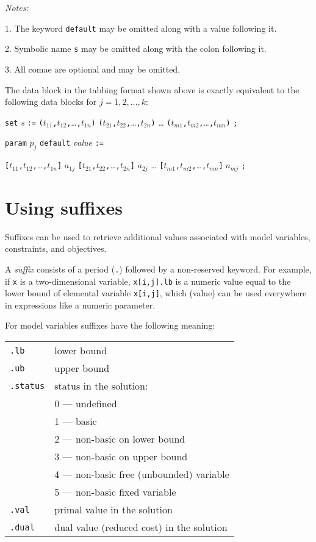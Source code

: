 \documentclass[10pt]{article}
\begin{document}
{\it Notes:}

1. The keyword {\tt default} may be omitted along with a value
following it.

2. Symbolic name {\tt s} may be omitted along with the colon following
it.

3. All comae are optional and may be omitted.

\medskip

The data block in the tabbing format shown above is exactly equivalent
to the following data blocks for $j=1,2,\dots,k$:

\medskip

{\tt set} {\it s} {\tt:=}
{\tt(}$t_{11}${\tt,}$t_{12}${\tt,}\dots{\tt,}$t_{1n}${\tt)}
{\tt(}$t_{21}${\tt,}$t_{22}${\tt,}\dots{\tt,}$t_{2n}${\tt)} \dots
{\tt(}$t_{m1}${\tt,}$t_{m2}${\tt,}\dots{\tt,}$t_{mn}${\tt)} {\tt;}

{\tt param} $p_j$ {\tt default} {\it value} {\tt:=}

$\!${\tt[}$t_{11}${\tt,}$t_{12}${\tt,}\dots{\tt,}$t_{1n}${\tt]}
$a_{1j}$
{\tt[}$t_{21}${\tt,}$t_{22}${\tt,}\dots{\tt,}$t_{2n}${\tt]} $a_{2j}$
\dots
{\tt[}$t_{m1}${\tt,}$t_{m2}${\tt,}\dots{\tt,}$t_{mn}${\tt]} $a_{mj}$
{\tt;}


\appendix

\newpage

\section{Using suffixes}

Suffixes can be used to retrieve additional values associated with
model variables, constraints, and objectives.

A {\it suffix} consists of a period ({\tt.}) followed by a non-reserved
keyword. For example, if {\tt x} is a two-dimensional variable,
{\tt x[i,j].lb} is a numeric value equal to the lower bound of
elemental variable {\tt x[i,j]}, which (value) can be used everywhere
in expressions like a numeric parameter.

For model variables suffixes have the following meaning:

\medskip

\begin{tabular}{@{}p{96pt}p{222pt}@{}}
{\tt.lb}&lower bound\\
{\tt.ub}&upper bound\\
{\tt.status}&status in the solution:\\
&0 --- undefined\\
&1 --- basic\\
&2 --- non-basic on lower bound\\
&3 --- non-basic on upper bound\\
&4 --- non-basic free (unbounded) variable\\
&5 --- non-basic fixed variable\\
{\tt.val}&primal value in the solution\\
{\tt.dual}&dual value (reduced cost) in the solution\\
\end{tabular}
\end{document}
